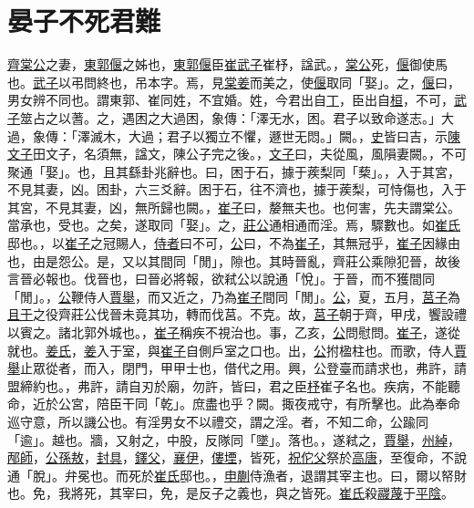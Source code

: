 \documentclass{article}
\newcommand{\tsu}{\small\kaishu\color{brown}}
\begin{document}
\section{晏子不死君難}

\noindent{\tsu 襄公二十五年}

\uline{齊棠公}之妻，\uline{東郭偃}之姊也，\uline{東郭偃}臣\uline{崔武子}{\tsu 崔杼，諡武。}，\uline{棠公}死，\uline{偃}御{\tsu 使馬也。}\uline{武子}以弔{\tsu 問終也，吊本字。}焉，見\uline{棠姜}而美之，使\uline{偃}取{\tsu 同「娶」。}之，\uline{偃}曰，男女辨{\tsu 不同也。謂東郭、崔同姓，不宜婚。}姓，今君出自\uline{丁}，臣出自\uline{桓}，不可，\uline{武子}筮{\tsu 占之以蓍。}之，遇困之大過{\tsu 困，象傳：「澤无水，困。君子以致命遂志。」大過，象傳：「澤滅木，大過；君子以獨立不懼，遯世无悶。」闕。}，\uline{史}皆曰吉，示\uline{陳文子}{\tsu 田文子，名須無，諡文，陳公子完之後。}，\uline{文子}曰，夫從風，風隕妻{\tsu 闕。}，不可聚{\tsu 通「娶」。}也，且其繇{\tsu 卦兆辭也。}曰，困于石，據于蒺梨{\tsu 同「蔾」。}，入于其宮，不見其妻，凶。{\tsu 困卦，六三爻辭。}困于石，往不濟也，據于蒺梨，可恃傷也，入于其宮，不見其妻，凶，無所歸也{\tsu 闕。}，\uline{崔子}曰，嫠{\tsu 無夫也。}也何害，先夫{\tsu 謂棠公。}當{\tsu 承也，受也。}之矣，遂取{\tsu 同「娶」。}之，\uline{莊公}通{\tsu 相通而淫。}焉，驟{\tsu 數也。}如\uline{崔氏}{\tsu 邸也。}，以\uline{崔子}之冠賜人，\uline{侍者}曰不可，\uline{公}曰，不為\uline{崔子}，其無冠乎，\uline{崔子}因{\tsu 緣由也，由是怨公。}是，又以其間{\tsu 同「閒」，隙也。其時晉亂，齊莊公乘隙犯晉，故後言晉必報也。}伐晉也，曰晉必將報，欲弒公以說{\tsu 通「悅」。}于晉，而不獲間{\tsu 同「閒」。}，\uline{公}鞭侍人\uline{賈舉}，而又近之，乃為\uline{崔子}間{\tsu 同「閒」。}\uline{公}，夏，五月，\uline{莒子}為\uline{且于}之役{\tsu 齊莊公伐晉未竟其功，轉而伐莒。不克。}故，\uline{莒子}朝于齊，甲戌，饗{\tsu 設禮以賓之。}諸北郭{\tsu 外城也。}，\uline{崔子}稱疾不視{\tsu 治也。}事，乙亥，\uline{公}問{\tsu 慰問。}\uline{崔子}，遂從{\tsu 就也。}\uline{姜氏}，\uline{姜}入于室，與\uline{崔子}自側戶{\tsu 室之口也。}出，\uline{公}拊楹{\tsu 柱也。}而歌，侍人\uline{賈舉}止眾從者，而入，閉門，甲{\tsu 甲士也，借代之用。}興，公登臺而請{\tsu 求也}，弗許，請盟{\tsu 締約也。}，弗許，請自刃於廟，勿許，皆曰，君之臣\uline{杼}{\tsu 崔子名也。}疾病，不能聽命，近於公宮，陪臣干{\tsu 同「乾」。庶盡也乎？闕。}掫{\tsu 夜戒守，有所擊也。此為奉命巡守意，所以譏公也。}有淫{\tsu 男女不以禮交，謂之淫。}者，不知二命，公踰{\tsu 同「逾」。越也。}牆，又射之，中股，反隊{\tsu 同「墜」。落也。}，遂弒之，\uline{賈舉}，\uline{州綽}，\uline{邴師}，\uline{公孫敖}，\uline{封具}，\uline{鐸父}，\uline{襄伊}，\uline{僂堙}，皆死，\uline{祝佗父}祭於\uline{高唐}，至復命，不說{\tsu 通「脫」。}弁{\tsu 冕也。}而死於\uline{崔氏}{\tsu 邸也。}，\uline{申蒯}侍漁者，退謂其宰{\tsu 主也。}曰，爾以帑{\tsu 財也。}免，我將死，其宰曰，免，是反子之義也，與之皆死。\uline{崔氏}殺\uline{鬷蔑}于\uline{平陰}。
\end{document}
